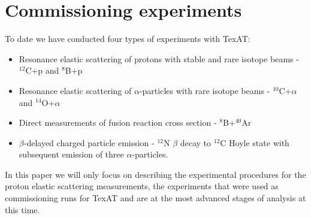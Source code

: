 \documentclass[final,number,sort&compress,5p,times,twocolumn]{elsarticle}
\begin{document}
\section{Commissioning experiments}%

To date we have conducted four types of experiments with TexAT:

\begin{itemize}
	\item Resonance elastic scattering of protons with stable and rare isotope beams - $^{12}$C+p and $^8$B+p
	\item Resonance elastic scattering of $\alpha$-particles with rare isotope beams - $^{10}$C+$\alpha$ and $^{14}$O+$\alpha$
	\item Direct measurements of fusion reaction cross section - $^8$B+$^{40}$Ar
	\item $\beta$-delayed charged particle emission - $^{12}$N $\beta$ decay to $^{12}$C Hoyle state with subsequent emission of three $\alpha$-particles.
\end{itemize}

In this paper we will only focus on describing the experimental procedures for the proton elastic scattering measurements, the experiments that were used as commissioning runs for TexAT and are at the most advanced stages of analysis at this time. 
\end{document}
